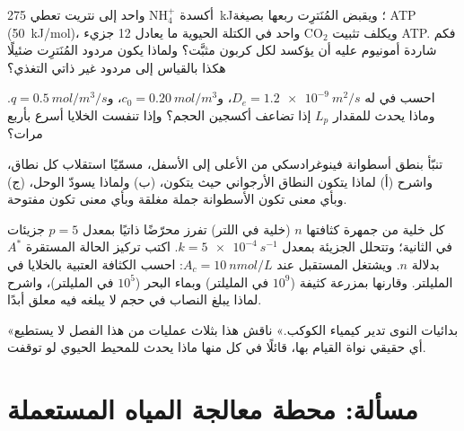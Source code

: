 \begin{exercise}[$\star\star$]\label{exo:b2:microbial-metabolism:8}
أكسدة $\mathrm{NH_4^+}$ واحد إلى نتريت تعطي \qty{275}{kJ}؛ ويقبض
المُنَترِت ربعها بصيغة ATP (\qty{50}{kJ/mol})، ويكلف تثبيت
$\mathrm{CO_2}$ واحد في الكتلة الحيوية ما يعادل 12 جزيء ATP. فكم
شاردة أمونيوم عليه أن يؤكسد لكل كربون مثبَّت؟ ولماذا يكون مردود
المُنَترِت ضئيلًا هكذا بالقياس إلى مردود غير ذاتي التغذي؟
\end{exercise}

\begin{exercise}[$\star\star$]\label{exo:b2:microbial-metabolism:9}
احسب  في  له $D_e =
\qty{1.2e-9}{m^2/s}$، و$c_0 = \qty{0.20}{mol/m^3}$، و$q =
\qty{0.5}{mol/m^3/s}$. وماذا يحدث للمقدار $L_p$ إذا تضاعف أكسجين الحجم؟
وإذا تنفست الخلايا أسرع بأربع مرات؟
\end{exercise}

\begin{exercise}[$\star\star\star$]\label{exo:b2:microbial-metabolism:10}
تنبّأ بنطق أسطوانة فينوغرادسكي من الأعلى إلى الأسفل، مسمّيًا
استقلاب كل نطاق، واشرح (أ) لماذا يتكون النطاق الأرجواني حيث يتكون،
(ب) ولماذا يسودّ الوحل، (ج) وبأي معنى تكون الأسطوانة جملة مغلقة
وبأي معنى تكون مفتوحة.
\end{exercise}

\begin{exercise}[$\star\star\star$]\label{exo:b2:microbial-metabolism:11}
كل خلية من جمهرة كثافتها $n$ (خلية في اللتر) تفرز محرّضًا ذاتيًا
بمعدل $p = 5$ جزيئات في الثانية؛ وتتحلل الجزيئة بمعدل
$k = \qty{5e-4}{s^{-1}}$. اكتب تركيز الحالة المستقرة $A^*$ بدلالة
$n$. ويشتغل المستقبل عند $A_c = \qty{10}{nmol/L}$: احسب الكثافة
العتبية بالخلايا في المليلتر. وقارنها بمزرعة كثيفة ($10^{9}$ في
المليلتر) وبماء البحر ($10^{5}$ في المليلتر)، واشرح لماذا يبلغ  النصاب في حجم لا يبلغه فيه معلق أبدًا.
\end{exercise}

\begin{exercise}[$\star\star\star$]\label{exo:b2:microbial-metabolism:12}
«بدائيات النوى تدير كيمياء الكوكب.» ناقش هذا بثلاث عمليات من هذا
الفصل لا يستطيع أي حقيقي نواة القيام بها، قائلًا في كل منها ماذا
يحدث للمحيط الحيوي لو توقفت.
\end{exercise}

\section{مسألة: محطة معالجة المياه المستعملة}

